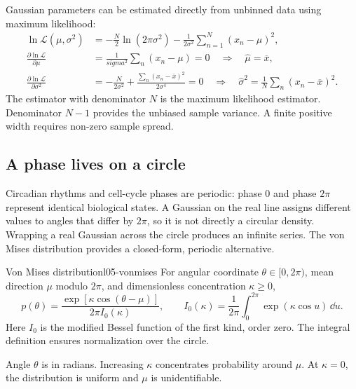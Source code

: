 Gaussian parameters can be estimated directly from unbinned data using maximum likelihood:
\begin{align}
\ln\mathcal L(\mu,\sigma^2)
&=-\frac N2\ln(2\pi\sigma^2)
 -\frac1{2\sigma^2}\sum_{n=1}^N(x_n-\mu)^2,\label{eq:l05-normal-likelihood}\\
\frac{\partial\ln\mathcal L}{\partial\mu}
&=\frac1{sigma^2}\sum_n(x_n-\mu)=0
\quad\Longrightarrow\quad\widehat\mu=\overline x,\label{eq:l05-normal-mean-mle}\\
\frac{\partial\ln\mathcal L}{\partial\sigma^2}
&=-\frac N{2\sigma^2}+\frac{\sum_n(x_n-\overline x)^2}{2\sigma^4}=0
\quad\Longrightarrow\quad
\widehat\sigma^2=\frac1N\sum_n(x_n-\overline x)^2.
\label{eq:l05-normal-var-mle}
\end{align}
The estimator with denominator $N$ is the maximum likelihood estimator. Denominator $N-1$ provides the unbiased sample variance. A finite positive width requires non-zero sample spread.

\subsection{A phase lives on a circle}
\label{subsec:l05-vonmises}
Circadian rhythms and cell-cycle phases are periodic: phase 0 and phase $2\pi$ represent identical biological states. A Gaussian on the real line assigns different values to angles that differ by $2\pi$, so it is not directly a circular density. Wrapping a real Gaussian across the circle produces an infinite series. The von Mises distribution provides a closed-form, periodic alternative.

\begin{definition}{Von Mises distribution}{l05-vonmises}
For angular coordinate $\theta\in[0,2\pi)$, mean direction $\mu$ modulo $2\pi$, and dimensionless concentration $\kappa\geq0$,
\begin{equation}
p(\theta)=\frac{\exp[\kappa\cos(\theta-\mu)]}{2\pi I_0(\kappa)},
\qquad
I_0(\kappa)=\frac1{2\pi}\int_0^{2\pi}\exp(\kappa\cos u)\,\dd u.
\label{eq:l05-vonmises}
\end{equation}
Here $I_0$ is the modified Bessel function of the first kind, order zero. The integral definition ensures normalization over the circle.
\end{definition}
Angle $\theta$ is in radians. Increasing $\kappa$ concentrates probability around $\mu$. At $\kappa=0$, the distribution is uniform and $\mu$ is unidentifiable.

